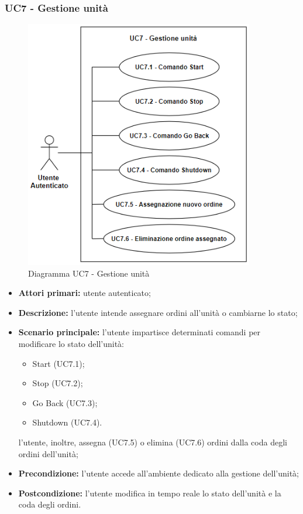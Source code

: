     \subsubsection{UC7 - Gestione unità}
    \begin{figure}[h!]
        \centering
        \includegraphics[width=10cm]{images/uc7.png}
        \caption{Diagramma UC7 - Gestione unità}
    \end{figure}
    \begin{itemize}
        \item \textbf{Attori primari:} utente autenticato;
        \item \textbf{Descrizione:} l'utente intende assegnare ordini all'unità o cambiarne lo stato;
        \item \textbf{Scenario principale:} l'utente impartisce determinati comandi per modificare lo stato dell'unità:
        \begin{itemize}
            \item Start (UC7.1);
            \item Stop (UC7.2);
            \item Go Back (UC7.3);
            \item Shutdown (UC7.4).
        \end{itemize}
        l'utente, inoltre, assegna (UC7.5) o elimina (UC7.6) ordini dalla coda degli ordini dell'unità;
        \item \textbf{Precondizione:} l'utente accede all'ambiente dedicato alla gestione dell'unità;
        \item \textbf{Postcondizione:} l'utente modifica in tempo reale lo stato dell'unità e la coda degli ordini.
    \end{itemize}

